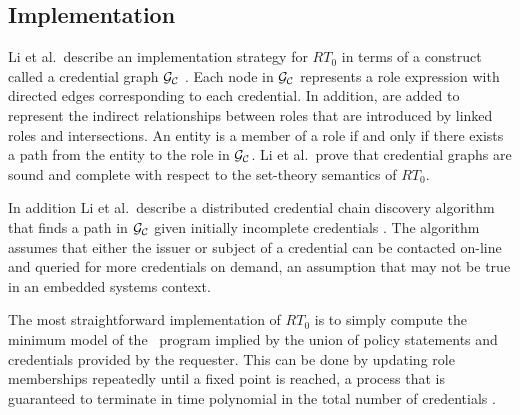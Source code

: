 \subsection{Implementation}

Li et al.~describe an implementation strategy for $RT_0$ in terms of a construct called a
credential graph $\mathcal{G}_{\mathcal{C}}$ \cite{Li:DCDTM}. Each node in $\mathcal{G}_{\mathcal{C}}$
represents a role expression with directed edges corresponding to each credential. In addition,
 are added to represent the indirect relationships between roles that are
introduced by linked roles and intersections. An entity is a member of a role if and only if
there exists a path from the entity to the role in $\mathcal{G}_{\mathcal{C}}$. Li et al.~prove that
credential graphs are sound and complete with respect to the set-theory semantics of $RT_0$.

In addition Li et al.~describe a distributed credential chain discovery algorithm that finds a
path in $\mathcal{G}_{\mathcal{C}}$ given initially incomplete credentials \cite{Li:DCDTM}. The
algorithm assumes that either the issuer or subject of a credential can be contacted on-line and
queried for more credentials on demand, an assumption that may not be true in an embedded
systems context.

The most straightforward implementation of $RT_0$ is to simply compute the minimum model of the
\datalog\ program implied by the union of policy statements and credentials provided by the
requester. This can be done by updating role memberships repeatedly until a fixed point is
reached, a process that is guaranteed to terminate in time polynomial in the total number of
credentials \cite{Li:DCFTML}.

